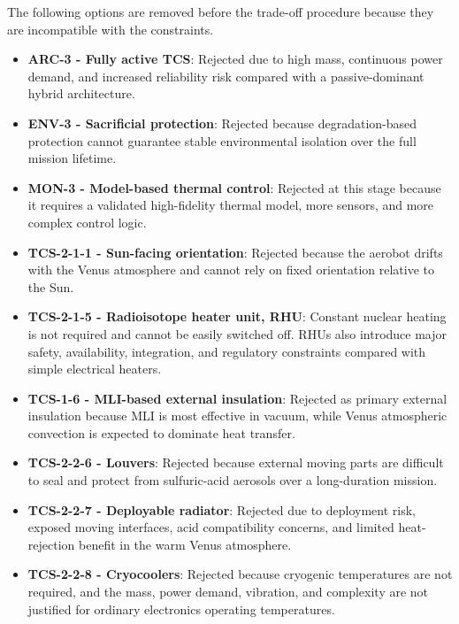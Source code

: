 The following options are removed before the trade-off procedure because they are incompatible with the constraints.

\begin{itemize}[itemsep=1pt, parsep=1pt]

\item \textbf{ARC-3 - Fully active TCS}: Rejected due to high mass, continuous power demand, and increased reliability risk compared with a passive-dominant hybrid architecture.

\item \textbf{ENV-3 - Sacrificial protection}: Rejected because degradation-based protection cannot guarantee stable environmental isolation over the full mission lifetime.

\item \textbf{MON-3 - Model-based thermal control}: Rejected at this stage because it requires a validated high-fidelity thermal model, more sensors, and more complex control logic.

\item \textbf{TCS-2-1-1 - Sun-facing orientation}: Rejected because the aerobot drifts with the Venus atmosphere and cannot rely on fixed orientation relative to the Sun.
\item \textbf{TCS-2-1-5 - Radioisotope heater unit, RHU}: Constant nuclear heating is not required and cannot be easily switched off. RHUs also introduce major safety, availability, integration, and regulatory constraints compared with simple electrical heaters.
\item \textbf{TCS-1-6 - MLI-based external insulation}: Rejected as primary external insulation because MLI is most effective in vacuum, while Venus atmospheric convection is expected to dominate heat transfer.

\item \textbf{TCS-2-2-6 - Louvers}: Rejected because external moving parts are difficult to seal and protect from sulfuric-acid aerosols over a long-duration mission.

\item \textbf{TCS-2-2-7 - Deployable radiator}: Rejected due to deployment risk, exposed moving interfaces, acid compatibility concerns, and limited heat-rejection benefit in the warm Venus atmosphere.

\item \textbf{TCS-2-2-8 - Cryocoolers}: Rejected because cryogenic temperatures are not required, and the mass, power demand, vibration, and complexity are not justified for ordinary electronics operating temperatures.

\end{itemize}

